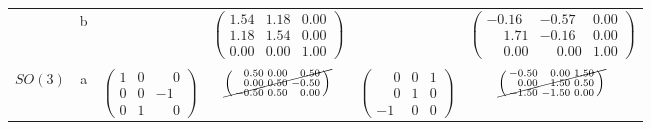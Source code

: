 \documentclass[12pt]{article}
\begin{document}
\begin{table}[htbp]
\begin{center}
\begin{tabular}{ c c c c c c}
      &
      \multirow{2}{*}{b}
      &

      &
      \multirow{2}{*}{
        $\left(
          \begin{smallmatrix}
            1.54 & 1.18 & 0.00\\
            1.18 & 1.54 & 0.00\\
            0.00 & 0.00 & 1.00
          \end{smallmatrix}
        \right)$}
      &

      &
      \multirow{2}{*}{
        $\left(
          \begin{smallmatrix}
            -0.16 & -0.57 & 0.00\\
            \phantom{-}1.71 & -0.16 & 0.00\\
            \phantom{-}0.00 & \phantom{-}0.00 & 1.00
          \end{smallmatrix}
        \right)$}
      \\
      \\
      \\
      \multirow{4}{*}{$SO(3)$}
      &
      \multirow{2}{*}{a}
      &
      \multirow{4}{*}{
        $\left(
          \begin{smallmatrix}
            1 & 0 & \phantom{-}0\\
            0 & 0 & -1\\
            0 & 1 & \phantom{-}0
          \end{smallmatrix}
        \right)$}
      &
      \multirow{2}{*}{
        $\cancel{\left(
          \begin{smallmatrix}
            \phantom{-}0.50 & 0.00 & \phantom{-}0.50\\
            \phantom{-}0.00 & 0.50 & -0.50\\
            -0.50 & 0.50 & \phantom{-}0.00
          \end{smallmatrix}
        \right)}$}
      &
      \multirow{4}{*}{
        $\left(
          \begin{smallmatrix}
            \phantom{-}0 & 0 & 1\\
            \phantom{-}0 & 1 & 0\\
            -1 & 0 & 0
          \end{smallmatrix}
        \right)$}
      &
      \multirow{2}{*}{
        $\cancel{\left(
          \begin{smallmatrix}
            -0.50 & \phantom{-}0.00 & 1.50\\
            \phantom{-}0.00 & \phantom{-}1.50 & 0.50\\
            -1.50 & -1.50 & 0.00
          \end{smallmatrix}
        \right)}$}
      \\
      \\


\end{tabular}
\end{center}
\end{table}
\end{document}
